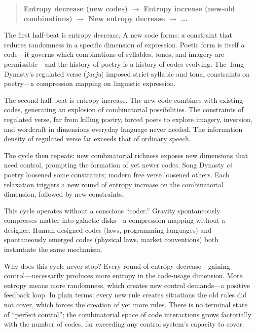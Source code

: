 \documentclass[11pt,a4paper]{article}
\begin{document}
\begin{quote}
\textbf{Entropy decrease (new codes) $\rightarrow$ Entropy increase (new-old combinations) $\rightarrow$ New entropy decrease $\rightarrow$ ...}
\end{quote}

The first half-beat is entropy decrease. A new code forms: a constraint that reduces randomness in a specific dimension of expression. Poetic form is itself a code---it governs which combinations of syllables, tones, and imagery are permissible---and the history of poetry is a history of codes evolving. The Tang Dynasty's regulated verse (\textit{jueju}) imposed strict syllabic and tonal constraints on poetry---a compression mapping on linguistic expression.

The second half-beat is entropy increase. The new code combines with existing codes, generating an explosion of combinatorial possibilities. The constraints of regulated verse, far from killing poetry, forced poets to explore imagery, inversion, and wordcraft in dimensions everyday language never needed. The information density of regulated verse far exceeds that of ordinary speech.

The cycle then repeats: new combinatorial richness exposes new dimensions that need control, prompting the formation of yet newer codes. Song Dynasty \textit{ci} poetry loosened some constraints; modern free verse loosened others. Each relaxation triggers a new round of entropy increase on the combinatorial dimension, followed by new constraints.

This cycle operates without a conscious ``coder.'' Gravity spontaneously compresses matter into galactic disks---a compression mapping without a designer. Human-designed codes (laws, programming languages) and spontaneously emerged codes (physical laws, market conventions) both instantiate the same mechanism.

Why does this cycle never stop? Every round of entropy decrease---gaining control---necessarily produces more entropy in the code-usage dimension. More entropy means more randomness, which creates new control demands---a positive feedback loop. In plain terms: every new rule creates situations the old rules did not cover, which forces the creation of yet more rules. There is no terminal state of ``perfect control''; the combinatorial space of code interactions grows factorially with the number of codes, far exceeding any control system's capacity to cover.
\end{document}
